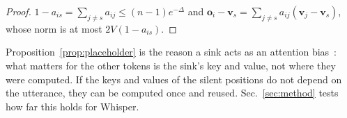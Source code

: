 \begin{proof}
$1-a_{is}=\sum_{j\ne s}a_{ij}\le(n-1)e^{-\Delta}$ and $\mathbf{o}_i-\mathbf{v}_s=\sum_{j\ne s}a_{ij}(\mathbf{v}_j-\mathbf{v}_s)$, whose norm is at most $2V(1-a_{is})$.
\end{proof}

Proposition~\ref{prop:placeholder} is the reason a sink acts as an attention bias~\cite{sun2024massive,jiang2025testtime}: what matters for the other tokens is the sink's key and value, not where they were computed. If the keys and values of the silent positions do not depend on the utterance, they can be computed once and reused. Sec.~\ref{sec:method} tests how far this holds for Whisper.
